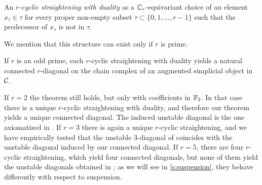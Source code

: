 \begin{definition}
	An \emph{$r$-cyclic straightening with duality} as a $\mathbb{C}_r$-equivariant choice of an element $x_\tau\in \tau$ for every proper non-empty subset $\tau \subset \{0,1,\dots,r-1\}$ such that the predecessor of $x_\tau$ is not in $\tau$.
\end{definition}

We mention that this structure can exist only if $r$ is prime.

\begin{theorem}\label{thm:main}
	If $r$ is an odd prime, each $r$-cyclic straightening with duality yields a natural connected $r$-diagonal on the chain complex of an augmented simplicial object in $\mathcal{C}$.
\end{theorem}

If $r=2$ the theorem still holds, but only with coefficients in $\mathbb{F}_2$.
In that case there is a unique $r$-cyclic straightening with duality, and therefore our theorem yields a unique connected diagonal.
The induced unstable diagonal is the one axiomatized in \cite{medina2022axiomatic}.
If $r = 3$ there is again a unique $r$-cyclic straightening, and we have empirically tested that the unstable $3$-diagonal of \cite{medina2021may_st} coincides with the unstable diagonal induced by our connected diagonal.
If $r = 5$, there are four $r$-cyclic straightening, which yield four connected diagonals, but none of them yield the unstable diagonals obtained in \cite{medina2021may_st}; as we will see in \cref{s:suspension}, they behave differently with respect to suspension.


